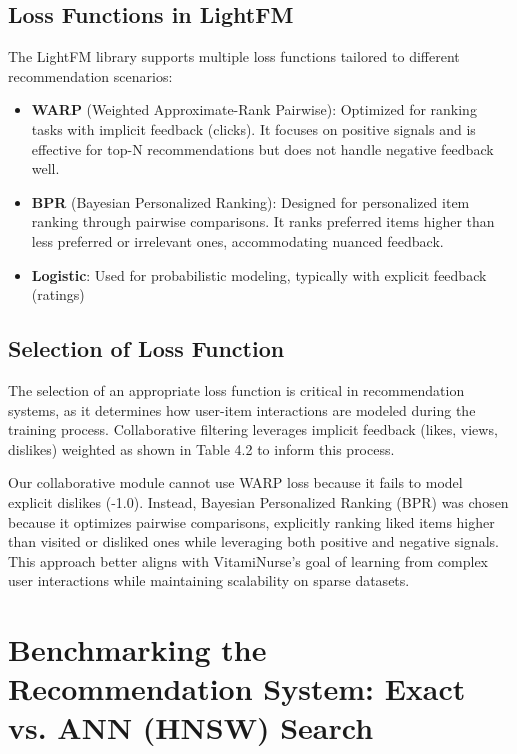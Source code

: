 \subsection{Loss Functions in LightFM}

The LightFM library supports multiple loss functions tailored to different recommendation scenarios:
\begin{itemize}
    \item \textbf{WARP} (Weighted Approximate-Rank Pairwise): Optimized for ranking tasks with implicit feedback (clicks). It focuses on positive signals and is effective for top-N recommendations but does not handle negative feedback well.
    \item \textbf{BPR} (Bayesian Personalized Ranking): Designed for personalized item ranking through pairwise comparisons. It ranks preferred items higher than less preferred or irrelevant ones, accommodating nuanced feedback.
    \item \textbf{Logistic}: Used for probabilistic modeling, typically with explicit feedback (ratings)
\end{itemize}

\subsection{Selection of Loss Function}

\par The selection of an appropriate loss function is critical in recommendation
systems, as it determines how user-item interactions are modeled during
the training process. Collaborative filtering leverages implicit feedback
(likes, views, dislikes) weighted as shown in Table 4.2 to inform this
process.
\par Our collaborative module cannot use WARP loss because it fails to model
explicit dislikes (-1.0). Instead, Bayesian Personalized Ranking
(BPR) was chosen because it optimizes pairwise comparisons, explicitly
ranking liked items higher than visited or disliked ones while leveraging
both positive and negative signals. This approach better aligns with
VitamiNurse’s goal of learning from complex user interactions while
maintaining scalability on sparse datasets.

\newpage
\section{Benchmarking the Recommendation System: Exact vs. ANN (HNSW) Search}

